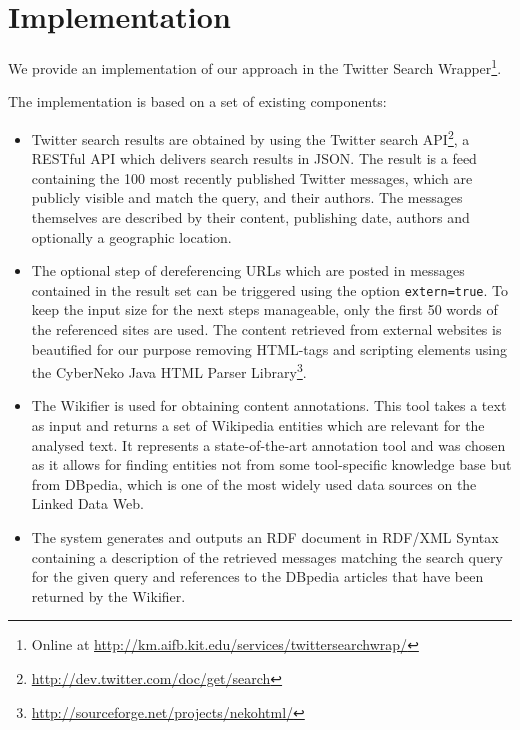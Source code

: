\documentclass{llncs}
\begin{document}
\section{Implementation}

We provide an implementation of our approach in the Twitter Search Wrapper\footnote{Online at \url{http://km.aifb.kit.edu/services/twittersearchwrap/}}.

The implementation is based on a set of existing components: 
\begin{itemize}
\item Twitter search results are obtained by using the Twitter search API\footnote{\url{http://dev.twitter.com/doc/get/search}}, a RESTful API which delivers search results in JSON. The result is a feed containing the 100 most recently published Twitter messages, which are publicly visible and match the query, and their authors. The messages themselves are described by their content, publishing date, authors
and optionally a geographic location.

\item The optional step of dereferencing URLs which are posted in messages contained
in the result set can be triggered using the option \texttt{extern=true}. To keep the input size for the next steps manageable, only the first 50 words of the referenced sites are used. The content
retrieved from external websites is beautified for our purpose removing
HTML-tags and scripting elements using the CyberNeko Java HTML Parser
Library\footnote{\url{http://sourceforge.net/projects/nekohtml/}}.

\item The Wikifier \cite{key:wikifier} is used for obtaining content annotations. This tool takes a text as input and returns a set of Wikipedia entities which are relevant for the analysed text. It represents a state-of-the-art annotation tool and was chosen as it allows for finding entities not from some tool-specific knowledge base but from DBpedia, which is one of the most widely used data sources on the Linked Data Web.

\item The system generates and outputs an RDF document in RDF/XML Syntax containing a
description of the retrieved messages matching the search query for the given query and references to the DBpedia articles that have been returned by the Wikifier. 


\end{itemize}
\end{document}
